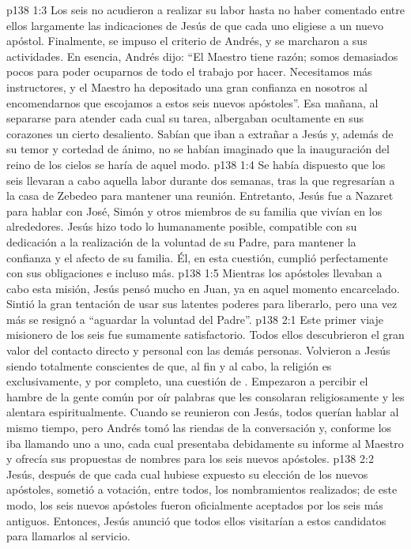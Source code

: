 \vs p138 1:3 Los seis no acudieron a realizar su labor hasta no haber comentado entre ellos largamente las indicaciones de Jesús de que cada uno eligiese a un nuevo apóstol. Finalmente, se impuso el criterio de Andrés, y se marcharon a sus actividades. En esencia, Andrés dijo: “El Maestro tiene razón; somos demasiados pocos para poder ocuparnos de todo el trabajo por hacer. Necesitamos más instructores, y el Maestro ha depositado una gran confianza en nosotros al encomendarnos que escojamos a estos seis nuevos apóstoles”. Esa mañana, al separarse para atender cada cual su tarea, albergaban ocultamente en sus corazones un cierto desaliento. Sabían que iban a extrañar a Jesús y, además de su temor y cortedad de ánimo, no se habían imaginado que la inauguración del reino de los cielos se haría de aquel modo.
\vs p138 1:4 Se había dispuesto que los seis llevaran a cabo aquella labor durante dos semanas, tras la que regresarían a la casa de Zebedeo para mantener una reunión. Entretanto, Jesús fue a Nazaret para hablar con José, Simón y otros miembros de su familia que vivían en los alrededores. Jesús hizo todo lo humanamente posible, compatible con su dedicación a la realización de la voluntad de su Padre, para mantener la confianza y el afecto de su familia. Él, en esta cuestión, cumplió perfectamente con sus obligaciones e incluso más.
\vs p138 1:5 Mientras los apóstoles llevaban a cabo esta misión, Jesús pensó mucho en Juan, ya en aquel momento encarcelado. Sintió la gran tentación de usar sus latentes poderes para liberarlo, pero una vez más se resignó a “aguardar la voluntad del Padre”.
\vs p138 2:1 Este primer viaje misionero de los seis fue sumamente satisfactorio. Todos ellos descubrieron el gran valor del contacto directo y personal con las demás personas. Volvieron a Jesús siendo totalmente conscientes de que, al fin y al cabo, la religión es exclusivamente, y por completo, una cuestión de . Empezaron a percibir el hambre de la gente común por oír palabras que les consolaran religiosamente y les alentara espiritualmente. Cuando se reunieron con Jesús, todos querían hablar al mismo tiempo, pero Andrés tomó las riendas de la conversación y, conforme los iba llamando uno a uno, cada cual presentaba debidamente su informe al Maestro y ofrecía sus propuestas de nombres para los seis nuevos apóstoles.
\vs p138 2:2 Jesús, después de que cada cual hubiese expuesto su elección de los nuevos apóstoles, sometió a votación, entre todos, los nombramientos realizados; de este modo, los seis nuevos apóstoles fueron oficialmente aceptados por los seis más antiguos. Entonces, Jesús anunció que todos ellos visitarían a estos candidatos para llamarlos al servicio.
